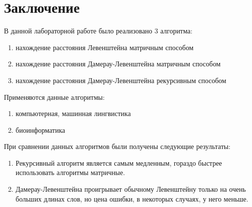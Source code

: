 \documentclass[a4paper,14pt]{report} %
\begin{document}
    \begin{figure}[h]
  \end{figure} 

\chapter{Заключение}

В данной лабораторной работе было реализовано 3 алгоритма:
\begin{enumerate}
  \item нахождение расстояния Левенштейна матричным способом \\
  \item нахождение расстояния Дамерау-Левенштейна матричным способом \\
  \item нахождение расстояния Дамерау-Левенштейна рекурсивным способом \\
\end{enumerate}
Применяются данные алгоритмы:
\begin{enumerate}
  \item компьютерная, машинная лингвистика \\
  \item биоинформатика \\
\end{enumerate}

При сравнении данных алгоритмов были получены следующие результаты:
\begin{enumerate}
  \item Рекурсивный алгоритм является самым медленным, гораздо быстрее использовать алгоритмы матричные.   \\
  \item Дамерау-Левенштейна проигрывает обычному Левенштейну только на очень больших длинах слов, но цена ошибки, в некоторых случаях, у него меньше.\\
\end{enumerate}
\end{document}
